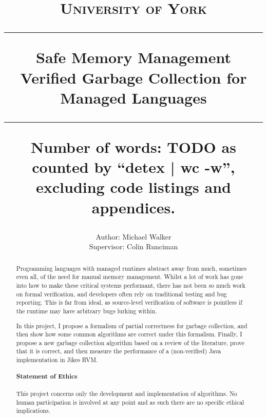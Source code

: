 \documentclass[10pt,a4paper,twoside,openright]{report}
\title{%
{\normalsize\scshape University of York}\\
\vspace{2em}
\hrule
\vspace{1em}
{\huge\bfseries Safe Memory Management}\\
\vspace{1em}
{\bfseries Verified Garbage Collection for\\
Managed Languages}\\
\vspace{1em}
\hrule
\vfill%
{\normalsize Number of words: TODO as counted by ``detex | wc -w'',\\
excluding code listings and appendices.}
}
\author{%
Author: Michael Walker\\
Supervisor: Colin Runciman
}
\date{}
\begin{document}
\pagestyle{empty}

\maketitle

\cleardoublepage
\begin{abstract}
Programming languages with managed runtimes abstract away from much,
sometimes even all, of the need for manual memory management. Whilst
a lot of work has gone into how to make these critical systems
performant, there has not been so much work on formal verification,
and developers often rely on traditional testing and bug
reporting. This is far from ideal, as source-level verification of
software is pointless if the runtime may have arbitrary bugs lurking
within.

In this project, I propose a formalism of partial correctness for
garbage collection, and then show how some common algorithms are
correct under this formalism. Finally, I propose a new garbage
collection algorithm based on a review of the literature, prove that
it is correct, and then measure the performance of a (non-verified)
Java implementation in Jikes RVM.  \vfill

\paragraph{Statement of Ethics}

This project concerns only the development and implementation of
algorithms. No human participation is involved at any point and as
such there are no specific ethical implications.
\end{abstract}


\cleardoublepage
\pagestyle{plain}
\setcounter{page}{1}
\tableofcontents


\newpage
\cleardoublepage
{}











\end{document}
